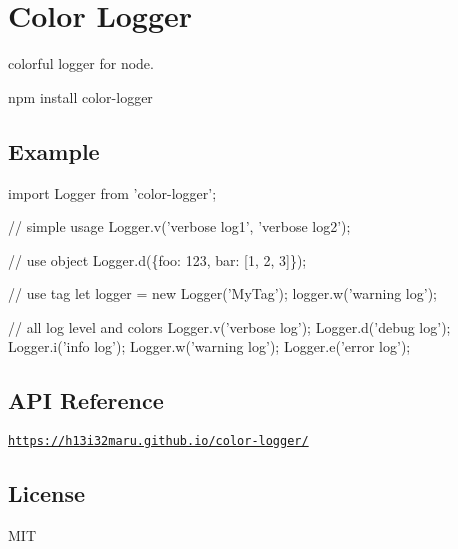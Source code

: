 \href{https://travis-ci.org/h13i32maru/color-logger}{\tt } \href{https://coveralls.io/r/h13i32maru/color-logger}{\tt }

\section*{Color Logger}

colorful logger for node.


\begin{DoxyCode}
npm install color-logger
\end{DoxyCode}


\subsection*{Example}


\begin{DoxyCode}
import Logger from 'color-logger';

// simple usage
Logger.v('verbose log1', 'verbose log2');

// use object
Logger.d(\{foo: 123, bar: [1, 2, 3]\});

// use tag
let logger = new Logger('MyTag');
logger.w('warning log');

// all log level and colors
Logger.v('verbose log');
Logger.d('debug log');
Logger.i('info log');
Logger.w('warning log');
Logger.e('error log');
\end{DoxyCode}




\subsection*{A\+PI Reference}

\href{https://h13i32maru.github.io/color-logger/}{\tt https\+://h13i32maru.\+github.\+io/color-\/logger/}

\subsection*{License}

M\+IT 